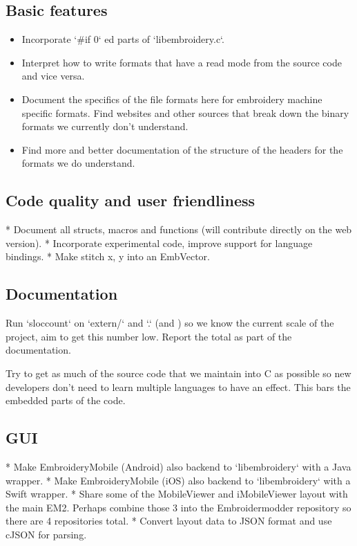 \documentclass[a4paper]{report}
\begin{document}
\subsection{Basic features}

\begin{itemize}
\item Incorporate `\#if 0` ed parts of `libembroidery.c`.
\item Interpret how to write formats that have a read mode from the source
code and vice versa.
\item Document the specifics of the file formats here for embroidery machine
specific formats. Find websites and other sources that break down the binary
formats we currently don't understand.
\item Find more and better documentation of the structure of the headers for the
formats we do understand.
\end{itemize}

\subsection{Code quality and user friendliness}

* Document all structs, macros and functions (will contribute directly
  on the web version).
* Incorporate experimental code, improve support for language bindings.
* Make stitch x, y into an EmbVector.

\subsection{Documentation}

Run `sloccount` on `extern/` and `.` (and ) so we know the
current scale of the project, aim to get this number low. Report the total as
part of the documentation.

Try to get as much of the source code that we maintain into C as possible so
new developers don't need to learn multiple languages to have an effect. This
bars the embedded parts of the code.

\subsection{GUI}

* Make EmbroideryMobile (Android) also backend to `libembroidery` with a Java wrapper.
* Make EmbroideryMobile (iOS) also backend to `libembroidery` with a Swift wrapper.
* Share some of the MobileViewer and iMobileViewer layout with the main EM2. Perhaps combine those 3 into the Embroidermodder repository so there are 4 repositories total.
* Convert layout data to JSON format and use cJSON for parsing.
\end{document}
